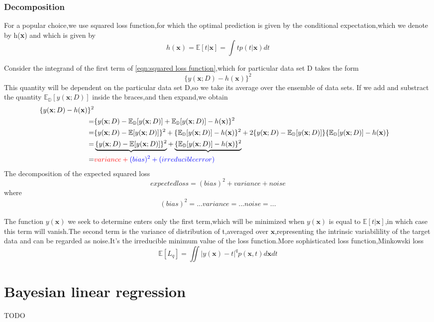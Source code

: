 \subsubsection{Decomposition}
For a popular choice,we use squared loss function,for which the optimal prediction is given by the conditional
expectation,which we denote by h(\textbf{x}) and which is given by 
\begin{equation}
h(\textbf{x}) = \mathbb{E}[t|\textbf{x}] = \int tp(t|\textbf{x})dt
\end{equation}


Consider the integrand of the first term of \ref{eqn:squared loss function},which for particular data set D takes the form
\begin{equation}
\{ y(\textbf{x};D) - h(\textbf{x}) \} ^2
\end{equation}
This quantity will be dependent on the particular data set D,so we take its average over the ensemble of data sets.
If we add and substract the quantity $ \mathbb{E_D}[y(\textbf{x};D)] $ inside the braces,and then expand,we obtain
\begin{align}
\{ y(\textbf{x};D) - h(\textbf{x}) \} ^2 \\
=&\{y(\textbf{x};D) - \mathbb{E_D}[y(\textbf{x};D)] + \mathbb{E_D}[y(\textbf{x};D)] -h(\textbf{x})  \}^2         \\
=& \{ y(\textbf{x};D) -\mathbb{E}[y(\textbf{x};D)]    \}^2 + \{ \mathbb{E_D}[y(\textbf{x};D)] - h(\textbf{x})\}^2 +
2\{ y(\textbf{x};D) - \mathbb{E_D}[y(\textbf{x};D)]\}\{ \mathbb{E_D}[y(\textbf{x};D)] -h(\textbf{x})\} \\
=& \underbrace{\{ y(\textbf{x};D) -\mathbb{E}[y(\textbf{x};D)]    \}^2} + \underbrace{\{ \mathbb{E_D}[y(\textbf{x};D)] - h(\textbf{x})\}^2}   \\
=&                    \color{red}{variance}                 +   \color{blue}{(bias)^2}  + (irreducible error)
\end{align}
The decomposition of the expected squared loss
\begin{equation}
expected loss = (bias)^2 + variance + noise
\end{equation}
where
\begin{eqnarray}
(bias)^2 = ...
variance = ...
noise = ...
\end{eqnarray}

The function $ y(\textbf{x}) $ we seek to determine enters only the first term,which will be minimized when $ y(\textbf{x}) $ is equal to $ \mathbb{E}[t|\textbf{x}] $,in which case this term will vanish.The second term is the variance of distribution of t,averaged over $ \textbf{x} $,representing the intrinsic variabilility of the target data and can be regarded as noise.It's the irreducible minimum value of the loss function.More sophisticated loss function,Minkowski loss
\begin{equation}
\mathbb{E}[\mathit{L_q}] = \iint| y(\textbf{x}) - t |^q p(\textbf{x},t)d\textbf{x}dt
\end{equation}


\section{Bayesian linear regression}
TODO

